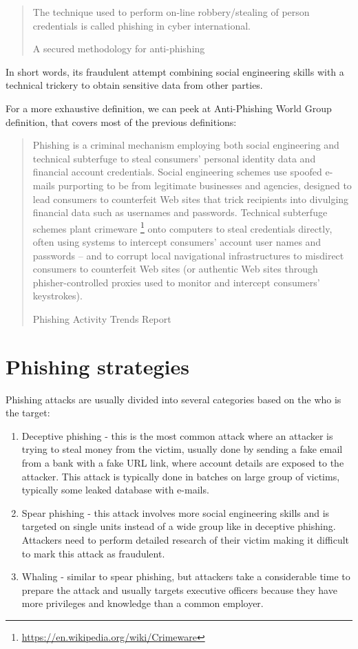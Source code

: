\documentclass[
  digital, %
  oneside, %
  table,   %
  nolof,     %
  nolot,     %
]{fithesis3}
\begin{document}
\blockquote[A secured methodology for anti-phishing \cite{secured-methodology}][]{
\par The   technique   used   to   perform   on-line   robbery/stealing  of  person  credentials  is  called  phishing  in cyber international.
}

\par

In short words, its fraudulent attempt combining social engineering skills with a technical trickery to obtain sensitive data from other parties. 

For a more exhaustive definition, we can peek at Anti-Phishing World Group definition, that covers most of the previous definitions:

\blockquote[Phishing Activity Trends Report \cite{apwg-2019-2}][]{
Phishing is a criminal mechanism employing both social
engineering and technical subterfuge to steal consumers’
personal identity data and financial account credentials.
Social engineering schemes use spoofed e-mails
purporting to be from legitimate businesses and
agencies, designed to lead consumers to counterfeit Web
sites that trick recipients into divulging financial data
such as usernames and passwords. Technical subterfuge
schemes plant crimeware \footnote{\url{https://en.wikipedia.org/wiki/Crimeware}} onto computers to steal
credentials directly, often using systems to intercept
consumers’ account user names and passwords -- and to
corrupt local navigational infrastructures to misdirect
consumers to counterfeit Web sites (or authentic Web
sites through phisher-controlled proxies used to monitor
and intercept consumers’ keystrokes).
}









\section{Phishing strategies}

Phishing attacks are usually divided into several categories based on the who is the target:
\begin{enumerate}
    \item Deceptive phishing - this is the most common attack where an attacker is trying to steal money from the victim, usually done by sending a fake email from a bank with a fake URL link, where account details are exposed to the attacker. This attack is typically done in batches on large group of victims, typically some leaked database with e-mails.
    \item Spear phishing - this attack involves more social engineering skills and is targeted on single units instead of a wide group like in deceptive phishing. Attackers need to perform detailed research of their victim making it difficult to mark this attack as fraudulent.
    \item Whaling - similar to spear phishing, but attackers take a considerable time to prepare the attack and usually targets executive officers because they have more privileges and knowledge than a common employer.
\end{enumerate}
\end{document}
